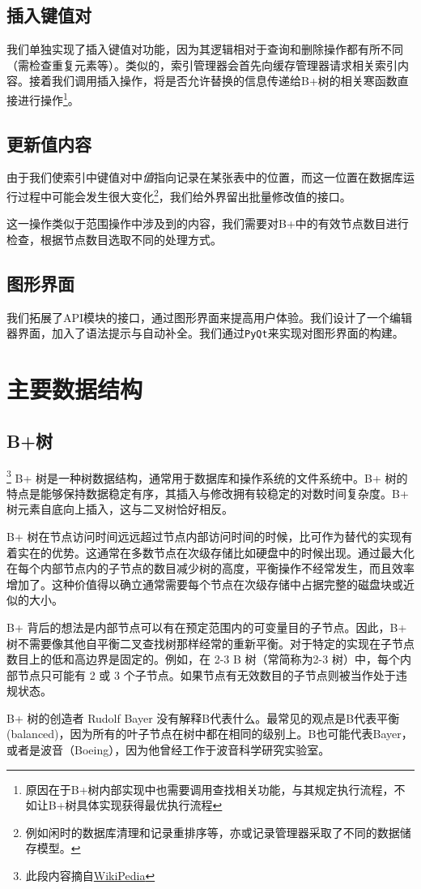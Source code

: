 \documentclass[UTF8]{ctexrep} %
\begin{document}
\subsection{插入键值对}
我们单独实现了插入键值对功能，因为其逻辑相对于查询和删除操作都有所不同（需检查重复元素等）。类似的，索引管理器会首先向缓存管理器请求相关索引内容。接着我们调用插入操作，将是否允许替换的信息传递给B+树的相关寒函数直接进行操作\footnote{原因在于B+树内部实现中也需要调用查找相关功能，与其规定执行流程，不如让B+树具体实现获得最优执行流程}。

\subsection{更新值内容}
由于我们使索引中键值对中\textit{值}指向记录在某张表中的位置，而这一位置在数据库运行过程中可能会发生很大变化\footnote{例如闲时的数据库清理和记录重排序等，亦或记录管理器采取了不同的数据储存模型。}，我们给外界留出批量修改值的接口。
\par
这一操作类似于范围操作中涉及到的内容，我们需要对B+中的有效节点数目进行检查，根据节点数目选取不同的处理方式。

\subsection{图形界面}
我们拓展了API模块的接口，通过图形界面来提高用户体验。我们设计了一个编辑器界面，加入了语法提示与自动补全。我们通过\texttt{PyQt}来实现对图形界面的构建。

\section{主要数据结构}
\subsection{B+树}
\footnote{此段内容摘自\href{https://en.wikipedia.org/wiki/B+_tree}{WikiPedia}}
B+ 树是一种树数据结构，通常用于数据库和操作系统的文件系统中。B+ 树的特点是能够保持数据稳定有序，其插入与修改拥有较稳定的对数时间复杂度。B+ 树元素自底向上插入，这与二叉树恰好相反。
\par
B+ 树在节点访问时间远远超过节点内部访问时间的时候，比可作为替代的实现有着实在的优势。这通常在多数节点在次级存储比如硬盘中的时候出现。通过最大化在每个内部节点内的子节点的数目减少树的高度，平衡操作不经常发生，而且效率增加了。这种价值得以确立通常需要每个节点在次级存储中占据完整的磁盘块或近似的大小。
\par
B+ 背后的想法是内部节点可以有在预定范围内的可变量目的子节点。因此，B+ 树不需要像其他自平衡二叉查找树那样经常的重新平衡。对于特定的实现在子节点数目上的低和高边界是固定的。例如，在 2-3 B 树（常简称为2-3 树）中，每个内部节点只可能有 2 或 3 个子节点。如果节点有无效数目的子节点则被当作处于违规状态。
\par
B+ 树的创造者 Rudolf Bayer 没有解释B代表什么。最常见的观点是B代表平衡(balanced)，因为所有的叶子节点在树中都在相同的级别上。B也可能代表Bayer，或者是波音（Boeing），因为他曾经工作于波音科学研究实验室。
\end{document}
